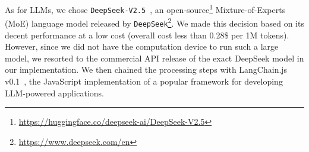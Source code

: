 As for LLMs, we chose \texttt{DeepSeek-V2.5}~\cite{deepseek-ai2024deepseekv2}, an open-source\footnote{\url{https://huggingface.co/deepseek-ai/DeepSeek-V2.5}} Mixture-of-Experts (MoE) language model released by \texttt{DeepSeek}\footnote{\url{https://www.deepseek.com/en}}. We made this decision based on its decent performance at a low cost (overall cost less than 0.28\$ per 1M tokens). However, since we did not have the computation device to run such a large model, we resorted to the commercial API release of the exact DeepSeek model in our implementation. 
We then chained the processing steps with LangChain.js v0.1~\cite{langchainjs}, the JavaScript implementation of a popular framework for developing LLM-powered applications.
